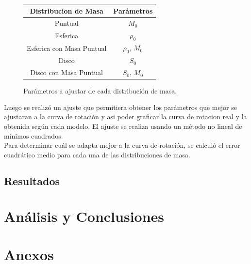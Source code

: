 \documentclass[letterpaper,oneside]{article}
\begin{document}
\begin{figure}
    \begin{tabular}{| c | c |}
     \hline
    Distribucion de Masa     & Parámetros  \\ \hline
    Puntual 	              &	$M_0$	\\
    Esferica                  &	$\rho_0$	\\
    Esferica con Masa Puntual &	$\rho_0$, $M_0$	\\
    Disco       	          &	$S_0$	\\
    Disco con Masa Puntual    &	$S_0$, $M_0$	\\
    \hline
    \end{tabular}
    \caption{Parámetros a ajustar de cada distribución de masa.}
\end{figure}

Luego se realizó un ajuste que permitiera obtener los parámetros que mejor se ajustaran a la curva de rotación y asi poder graficar la curva de rotacion  real y la obtenida según cada modelo. El ajuste se realiza usando un método no lineal de mínimos cuadrados.\\

Para determinar cuál se adapta mejor a la curva de rotación, se calculó el error cuadrático medio para cada una de las distribuciones de masa.

\subsection{Resultados}

\section{Análisis y Conclusiones}
\section{Anexos}
\end{document}
